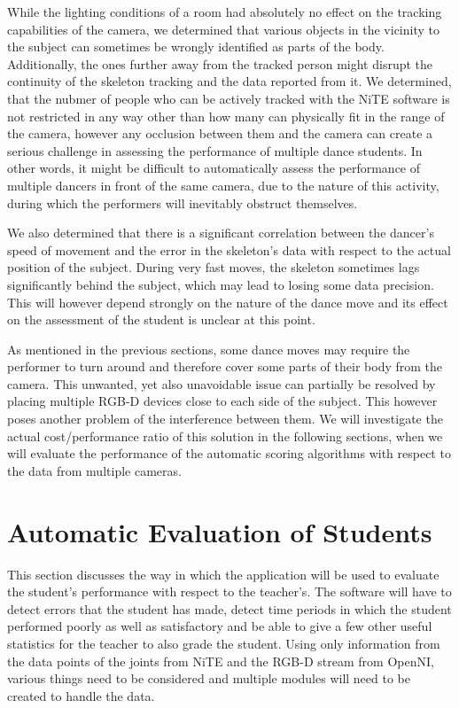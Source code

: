 \documentclass[10pt]{article}
\begin{document}
\medskip \noindent While the lighting conditions of a room had absolutely no effect on the tracking capabilities of the camera, we determined that various objects in the vicinity to the subject can sometimes be wrongly identified as parts of the body. Additionally, the ones further away from the tracked person might disrupt the continuity of the skeleton tracking and the data reported from it. We determined, that the nubmer of people who can be actively tracked with the NiTE software is not restricted in any way other than how many can physically fit in the range of the camera, however any occlusion between them and the camera can create a serious challenge in assessing the performance of multiple dance students. In other words, it might be difficult to automatically assess the performance of multiple dancers in front of the same camera, due to the nature of this activity, during which the performers will inevitably obstruct themselves.

\medskip \noindent We also determined that there is a significant correlation between the dancer's speed of movement and the error in the skeleton's data with respect to the actual position of the subject. During very fast moves, the skeleton sometimes lags significantly behind the subject, which may lead to losing some data precision. This will however depend strongly on the nature of the dance move and its effect on the assessment of the student is unclear at this point.

\medskip \noindent As mentioned in the previous sections, some dance moves may require the performer to turn around and therefore cover some parts of their body from the camera. This unwanted, yet also unavoidable issue can partially be resolved by placing multiple RGB-D devices close to each side of the subject. This however poses another problem of the interference between them. We will investigate the actual cost/performance ratio of this solution in the following sections, when we will evaluate the performance of the automatic scoring algorithms with respect to the data from multiple cameras.

\clearpage

\section{Automatic Evaluation of Students}
\noindent
This section discusses the way in which the application will be used to evaluate the student's performance with respect to the teacher's. The software will have to detect errors that the student has made, detect time periods in which the student performed poorly as well as satisfactory and be able to give a few other useful statistics for the teacher to also grade the student. Using only information from the data points of the joints from NiTE and the RGB-D stream from OpenNI, various things need to be considered and multiple modules will need to be created to handle the data. 
\end{document}
